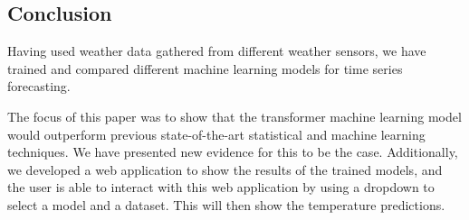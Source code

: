 \subsection{Conclusion}
Having used weather data gathered from different weather sensors, we have trained and compared different machine learning models for time series forecasting.

The focus of this paper was to show that the transformer machine learning model would outperform previous state-of-the-art statistical and machine learning techniques. 
We have presented new evidence for this to be the case.
Additionally, we developed a web application to show the results of the trained models, and the user is able to interact with this web application by using a dropdown to select a model and a dataset. This will then show the temperature predictions.
